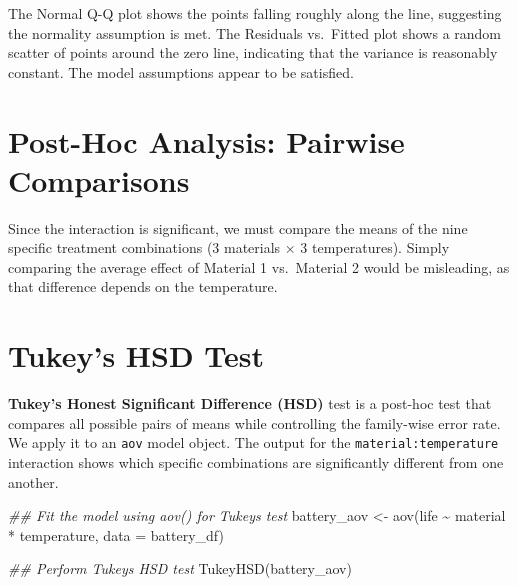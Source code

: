 \documentclass[
  letterpaper,
]{scrbook}
\newenvironment{Shaded}{\begin{snugshade}}{\end{snugshade}}
\newcommand{\AttributeTok}[1]{\textcolor[rgb]{0.40,0.45,0.13}{#1}}
\newcommand{\DocumentationTok}[1]{\textcolor[rgb]{0.37,0.37,0.37}{\textit{#1}}}
\newcommand{\FunctionTok}[1]{\textcolor[rgb]{0.28,0.35,0.67}{#1}}
\newcommand{\NormalTok}[1]{\textcolor[rgb]{0.00,0.23,0.31}{#1}}
\newcommand{\OtherTok}[1]{\textcolor[rgb]{0.00,0.23,0.31}{#1}}
\newcommand{\SpecialCharTok}[1]{\textcolor[rgb]{0.37,0.37,0.37}{#1}}
\begin{document}
The Normal Q-Q plot shows the points falling roughly along the line,
suggesting the normality assumption is met. The Residuals vs.~Fitted
plot shows a random scatter of points around the zero line, indicating
that the variance is reasonably constant. The model assumptions appear
to be satisfied.

\section{Post-Hoc Analysis: Pairwise
Comparisons}\label{post-hoc-analysis-pairwise-comparisons}

Since the interaction is significant, we must compare the means of the
nine specific treatment combinations (3 materials × 3 temperatures).
Simply comparing the average effect of Material 1 vs.~Material 2 would
be misleading, as that difference depends on the temperature.

\section{Tukey's HSD Test}\label{tukeys-hsd-test-2}

\textbf{Tukey's Honest Significant Difference (HSD)} test is a post-hoc
test that compares all possible pairs of means while controlling the
family-wise error rate. We apply it to an \texttt{aov} model object. The
output for the \texttt{material:temperature} interaction shows which
specific combinations are significantly different from one another.

\begin{Shaded}
\begin{Highlighting}[]
\DocumentationTok{\#\# Fit the model using aov() for Tukey\textquotesingle{}s test}
\NormalTok{battery\_aov }\OtherTok{\textless{}{-}} \FunctionTok{aov}\NormalTok{(life }\SpecialCharTok{\textasciitilde{}}\NormalTok{ material }\SpecialCharTok{*}\NormalTok{ temperature, }\AttributeTok{data =}\NormalTok{ battery\_df)}

\DocumentationTok{\#\# Perform Tukey\textquotesingle{}s HSD test}
\FunctionTok{TukeyHSD}\NormalTok{(battery\_aov)}
\end{Highlighting}
\end{Shaded}
\end{document}
